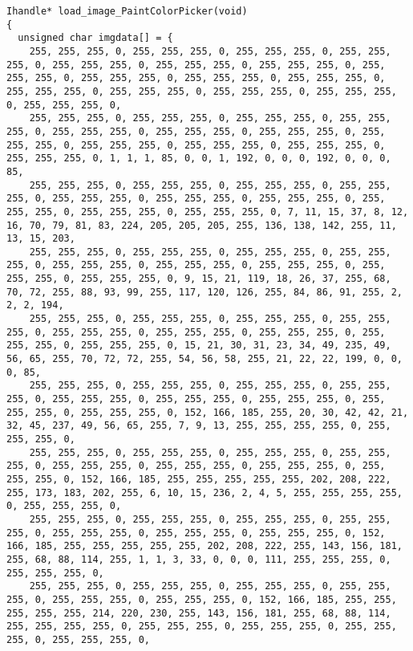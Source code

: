 \documentclass{ctexart}
\begin{document}
\begin{lstlisting}
Ihandle* load_image_PaintColorPicker(void)
{
  unsigned char imgdata[] = {
    255, 255, 255, 0, 255, 255, 255, 0, 255, 255, 255, 0, 255, 255, 255, 0, 255, 255, 255, 0, 255, 255, 255, 0, 255, 255, 255, 0, 255, 255, 255, 0, 255, 255, 255, 0, 255, 255, 255, 0, 255, 255, 255, 0, 255, 255, 255, 0, 255, 255, 255, 0, 255, 255, 255, 0, 255, 255, 255, 0, 255, 255, 255, 0,
    255, 255, 255, 0, 255, 255, 255, 0, 255, 255, 255, 0, 255, 255, 255, 0, 255, 255, 255, 0, 255, 255, 255, 0, 255, 255, 255, 0, 255, 255, 255, 0, 255, 255, 255, 0, 255, 255, 255, 0, 255, 255, 255, 0, 255, 255, 255, 0, 1, 1, 1, 85, 0, 0, 1, 192, 0, 0, 0, 192, 0, 0, 0, 85,
    255, 255, 255, 0, 255, 255, 255, 0, 255, 255, 255, 0, 255, 255, 255, 0, 255, 255, 255, 0, 255, 255, 255, 0, 255, 255, 255, 0, 255, 255, 255, 0, 255, 255, 255, 0, 255, 255, 255, 0, 7, 11, 15, 37, 8, 12, 16, 70, 79, 81, 83, 224, 205, 205, 205, 255, 136, 138, 142, 255, 11, 13, 15, 203,
    255, 255, 255, 0, 255, 255, 255, 0, 255, 255, 255, 0, 255, 255, 255, 0, 255, 255, 255, 0, 255, 255, 255, 0, 255, 255, 255, 0, 255, 255, 255, 0, 255, 255, 255, 0, 9, 15, 21, 119, 18, 26, 37, 255, 68, 70, 72, 255, 88, 93, 99, 255, 117, 120, 126, 255, 84, 86, 91, 255, 2, 2, 2, 194,
    255, 255, 255, 0, 255, 255, 255, 0, 255, 255, 255, 0, 255, 255, 255, 0, 255, 255, 255, 0, 255, 255, 255, 0, 255, 255, 255, 0, 255, 255, 255, 0, 255, 255, 255, 0, 15, 21, 30, 31, 23, 34, 49, 235, 49, 56, 65, 255, 70, 72, 72, 255, 54, 56, 58, 255, 21, 22, 22, 199, 0, 0, 0, 85,
    255, 255, 255, 0, 255, 255, 255, 0, 255, 255, 255, 0, 255, 255, 255, 0, 255, 255, 255, 0, 255, 255, 255, 0, 255, 255, 255, 0, 255, 255, 255, 0, 255, 255, 255, 0, 152, 166, 185, 255, 20, 30, 42, 42, 21, 32, 45, 237, 49, 56, 65, 255, 7, 9, 13, 255, 255, 255, 255, 0, 255, 255, 255, 0,
    255, 255, 255, 0, 255, 255, 255, 0, 255, 255, 255, 0, 255, 255, 255, 0, 255, 255, 255, 0, 255, 255, 255, 0, 255, 255, 255, 0, 255, 255, 255, 0, 152, 166, 185, 255, 255, 255, 255, 255, 202, 208, 222, 255, 173, 183, 202, 255, 6, 10, 15, 236, 2, 4, 5, 255, 255, 255, 255, 0, 255, 255, 255, 0,
    255, 255, 255, 0, 255, 255, 255, 0, 255, 255, 255, 0, 255, 255, 255, 0, 255, 255, 255, 0, 255, 255, 255, 0, 255, 255, 255, 0, 152, 166, 185, 255, 255, 255, 255, 255, 202, 208, 222, 255, 143, 156, 181, 255, 68, 88, 114, 255, 1, 1, 3, 33, 0, 0, 0, 111, 255, 255, 255, 0, 255, 255, 255, 0,
    255, 255, 255, 0, 255, 255, 255, 0, 255, 255, 255, 0, 255, 255, 255, 0, 255, 255, 255, 0, 255, 255, 255, 0, 152, 166, 185, 255, 255, 255, 255, 255, 214, 220, 230, 255, 143, 156, 181, 255, 68, 88, 114, 255, 255, 255, 255, 0, 255, 255, 255, 0, 255, 255, 255, 0, 255, 255, 255, 0, 255, 255, 255, 0,

\end{lstlisting}
\end{document}
